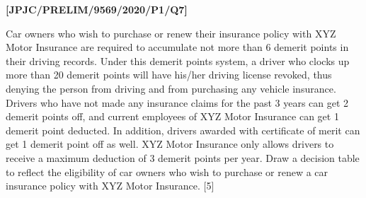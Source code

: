 \item \textbf{{[}JPJC/PRELIM/9569/2020/P1/Q7{]} }

Car owners who wish to purchase or renew their insurance policy with
XYZ Motor Insurance are required to accumulate not more than 6 demerit
points in their driving records. Under this demerit points system,
a driver who clocks up more than 20 demerit points will have his/her
driving license revoked, thus denying the person from driving and
from purchasing any vehicle insurance. Drivers who have not made any
insurance claims for the past 3 years can get 2 demerit points off,
and current employees of XYZ Motor Insurance can get 1 demerit point
deducted. In addition, drivers awarded with certificate of merit can
get 1 demerit point off as well. XYZ Motor Insurance only allows drivers
to receive a maximum deduction of 3 demerit points per year. Draw
a decision table to reflect the eligibility of car owners who wish
to purchase or renew a car insurance policy with XYZ Motor Insurance.
\hfill{}{[}5{]}